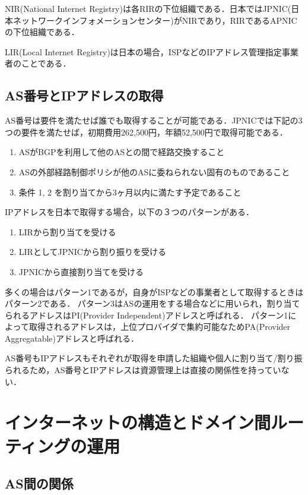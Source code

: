 NIR(National Internet Registry)は各RIRの下位組織である．日本ではJPNIC(日本ネットワークインフォメーションセンター)がNIRであり，RIRであるAPNICの下位組織である．

LIR(Local Internet Registry)は日本の場合，ISPなどのIPアドレス管理指定事業者のことである．

\subsection{AS番号とIPアドレスの取得}

AS番号は要件を満たせば誰でも取得することが可能である．JPNICでは下記の3つの要件を満たせば，初期費用262,500円，年額52,500円で取得可能である．

\begin{enumerate}
\item ASがBGPを利用して他のASとの間で経路交換すること
\item ASの外部経路制御ポリシが他のASに委ねられない固有のものであること
\item 条件 1, 2 を割り当てから3ヶ月以内に満たす予定であること
\end{enumerate}

IPアドレスを日本で取得する場合，以下の３つのパターンがある．

\begin{enumerate}
\item LIRから割り当てを受ける
\item LIRとしてJPNICから割り振りを受ける
\item JPNICから直接割り当てを受ける
\end{enumerate}

多くの場合はパターン1であるが，自身がISPなどの事業者として取得するときはパターン2である．
パターン3はASの運用をする場合などに用いられ，割り当てられるアドレスはPI(Provider Independent)アドレスと呼ばれる．
パターン1によって取得されるアドレスは，上位プロバイダで集約可能なためPA(Provider Aggregatable)アドレスと呼ばれる．

AS番号もIPアドレスもそれぞれが取得を申請した組織や個人に割り当て/割り振られるため，AS番号とIPアドレスは資源管理上は直接の関係性を持っていない．

\section{インターネットの構造とドメイン間ルーティングの運用}

\subsection{AS間の関係}

